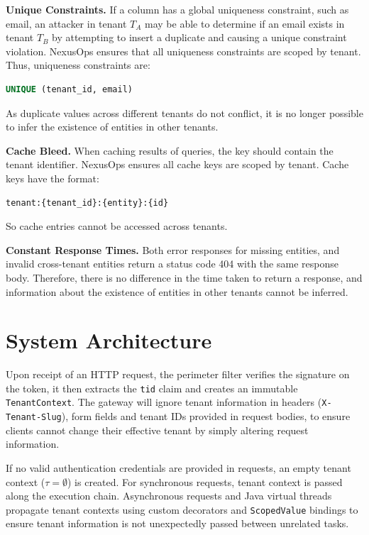 \documentclass[conference]{IEEEtran}
\begin{document}
\textbf{Unique Constraints.} If a column has a global uniqueness constraint, such as email, an attacker in tenant $T_A$ may be able to determine if an email exists in tenant $T_B$ by attempting to insert a duplicate and causing a unique constraint violation. NexusOps ensures that all uniqueness constraints are scoped by tenant. Thus, uniqueness constraints are:
\begin{lstlisting}[language=SQL]
UNIQUE (tenant_id, email)
\end{lstlisting}
As duplicate values across different tenants do not conflict, it is no longer possible to infer the existence of entities in other tenants.

\textbf{Cache Bleed.} When caching results of queries, the key should contain the tenant identifier. NexusOps ensures all cache keys are scoped by tenant. Cache keys have the format:
\begin{lstlisting}
tenant:{tenant_id}:{entity}:{id}
\end{lstlisting}
So cache entries cannot be accessed across tenants.

\textbf{Constant Response Times.} Both error responses for missing entities, and invalid cross-tenant entities return a status code 404 with the same response body. Therefore, there is no difference in the time taken to return a response, and information about the existence of entities in other tenants cannot be inferred.

\section{System Architecture}
\label{sec:architecture}

Upon receipt of an HTTP request, the perimeter filter verifies the signature on the token, it then extracts the \texttt{tid} claim and creates an immutable \texttt{TenantContext}. The gateway will ignore tenant information in headers (\texttt{X-Tenant-Slug}), form fields and tenant IDs provided in request bodies, to ensure clients cannot change their effective tenant by simply altering request information.

If no valid authentication credentials are provided in requests, an empty tenant context ($\tau = \emptyset$) is created. For synchronous requests, tenant context is passed along the execution chain. Asynchronous requests and Java virtual threads propagate tenant contexts using custom decorators and \texttt{ScopedValue} bindings to ensure tenant information is not unexpectedly passed between unrelated tasks.
\end{document}
